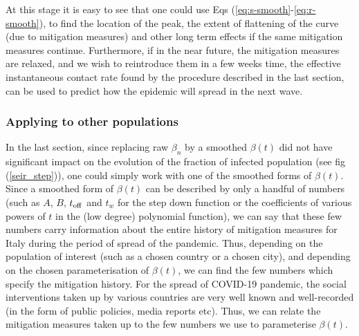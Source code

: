 \documentclass[aps,prd,10pt,twocolumn,nofootinbib]{revtex4-2}
\begin{document}
At this stage it is easy to see that one could use Eqs (\ref{eq:s-smooth}-\ref{eq:r-smooth}), to find the location of the peak, the extent of flattening of the curve (due to mitigation measures) and other long term effects if the same mitigation measures continue. Furthermore, if in the near future, the mitigation measures are relaxed, and we wish to reintroduce them in a few weeks time, the effective instantaneous contact rate found by the procedure described in the last section, can be used to predict how the epidemic will spread in the next wave.


\subsubsection{Applying to other populations}


In the last section, since replacing raw $\beta_n$ by a smoothed $\beta(t)$ did not have significant impact on the evolution of the fraction of infected population (see fig (\ref{seir_step})), one could simply work with one of the smoothed forms of $\beta(t)$. 
Since a smoothed form of $\beta(t)$ can be described by only a handful of numbers (such as $A$, $B$, $t_{\rm off}$ and $t_w$ for the step down function or the coefficients of various powers of $t$ in the (low degree) polynomial function), we can say that
these few numbers carry information about the entire history of mitigation measures for Italy during the period of spread of the pandemic.
Thus, depending on the population of interest (such as a chosen country or a chosen city), 
and depending on the chosen parameterisation of $\beta(t)$, we can find the few numbers which specify the mitigation history.
For the spread of COVID-19 pandemic, the social interventions taken up by various countries are very well known and well-recorded (in the form of public policies, media reports etc). Thus, we can relate the mitigation measures taken up to the few numbers we use to parameterise $\beta(t)$. 
\end{document}
